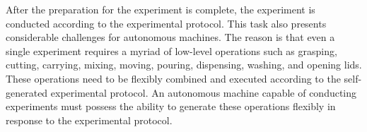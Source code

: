 After the preparation for the experiment is complete, the experiment is conducted according to the experimental protocol. This task also presents considerable challenges for autonomous machines. The reason is that even a single experiment requires a myriad of low-level operations such as grasping, cutting, carrying, mixing, moving, pouring, dispensing, washing, and opening lids. These operations need to be flexibly combined and executed according to the self-generated experimental protocol. An autonomous machine capable of conducting experiments must possess the ability to generate these operations flexibly in response to the experimental protocol.








